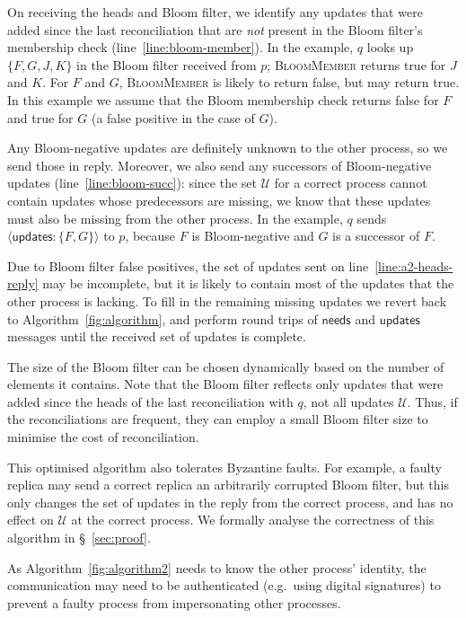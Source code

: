 \documentclass[a4paper,anonymous,USenglish]{lipics-v2019}
\begin{document}
On receiving the heads and Bloom filter, we identify any updates that were added since the last reconciliation that are \emph{not} present in the Bloom filter's membership check (line~\ref{line:bloom-member}).
In the example, $q$ looks up $\{F, G, J, K\}$ in the Bloom filter received from $p$; \textsc{BloomMember} returns true for $J$ and $K$. For $F$ and $G$, \textsc{BloomMember} is likely to return false, but may return true.
In this example we assume that the Bloom membership check returns false for $F$ and true for $G$ (a false positive in the case of $G$).

Any Bloom-negative updates are definitely unknown to the other process, so we send those in reply.
Moreover, we also send any successors of Bloom-negative updates (line~\ref{line:bloom-succ}): since the set $\mathcal{U}$ for a correct process cannot contain updates whose predecessors are missing, we know that these updates must also be missing from the other process.
In the example, $q$ sends $\langle\mathsf{updates}: \{F, G\}\rangle$ to $p$, because $F$ is Bloom-negative and $G$ is a successor of $F$.

Due to Bloom filter false positives, the set of updates sent on line~\ref{line:a2-heads-reply} may be incomplete, but it is likely to contain most of the updates that the other process is lacking.
To fill in the remaining missing updates we revert back to Algorithm~\ref{fig:algorithm}, and perform round trips of $\mathsf{needs}$ and $\mathsf{updates}$ messages until the received set of updates is complete.

The size of the Bloom filter can be chosen dynamically based on the number of elements it contains.
Note that the Bloom filter reflects only updates that were added since the heads of the last reconciliation with $q$, not all updates $\mathcal{U}$.
Thus, if the reconciliations are frequent, they can employ a small Bloom filter size to minimise the cost of reconciliation.

This optimised algorithm also tolerates Byzantine faults.
For example, a faulty replica may send a correct replica an arbitrarily corrupted Bloom filter, but this only changes the set of updates in the reply from the correct process, and has no effect on $\mathcal{U}$ at the correct process.
We formally analyse the correctness of this algorithm in \S~\ref{sec:proof}.

As Algorithm~\ref{fig:algorithm2} needs to know the other process' identity, the communication may need to be authenticated (e.g.\ using digital signatures) to prevent a faulty process from impersonating other processes.
\end{document}
